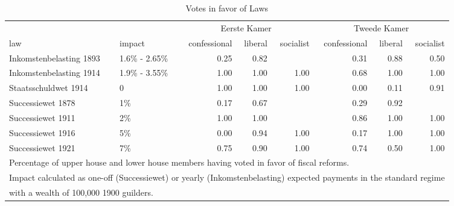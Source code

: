 \begin{table}

\caption{\label{tab:votespercentage}Votes in favor of Laws}
\centering
\begin{tabular}[t]{llrrrrrr}
\toprule
\multicolumn{2}{c}{ } & \multicolumn{3}{c}{Eerste Kamer} & \multicolumn{3}{c}{Tweede Kamer} \\
\cmidrule(l{3pt}r{3pt}){3-5} \cmidrule(l{3pt}r{3pt}){6-8}
law & impact & confessional & liberal & socialist & confessional  & liberal  & socialist \\
\midrule
Inkomstenbelasting 1893 & 1.6\% - 2.65\% & 0.25 & 0.82 &  & 0.31 & 0.88 & 0.50\\
Inkomstenbelasting 1914 & 1.9\% - 3.55\% & 1.00 & 1.00 & 1.00 & 0.68 & 1.00 & 1.00\\
Staatsschuldwet 1914 & 0 & 1.00 & 1.00 & 1.00 & 0.00 & 0.11 & 0.91\\
Successiewet 1878 & 1\% & 0.17 & 0.67 &  & 0.29 & 0.92 & \\
Successiewet 1911 & 2\% & 1.00 & 1.00 &  & 0.86 & 1.00 & 1.00\\
Successiewet 1916 & 5\% & 0.00 & 0.94 & 1.00 & 0.17 & 1.00 & 1.00\\
Successiewet 1921 & 7\% & 0.75 & 0.90 & 1.00 & 0.74 & 0.50 & 1.00\\
\bottomrule
\multicolumn{8}{l}{\rule{0pt}{1em}\footnotesize{Percentage of upper house and lower house members having voted in favor of fiscal reforms.}}\\
\multicolumn{8}{l}{\rule{0pt}{1em}\footnotesize{Impact calculated as one-off (Successiewet) or yearly (Inkomstenbelasting) expected payments in the standard regime}}\\
\multicolumn{8}{l}{\rule{0pt}{1em}\footnotesize{with a wealth of 100,000 1900 guilders.}}\\
\end{tabular}
\end{table}
